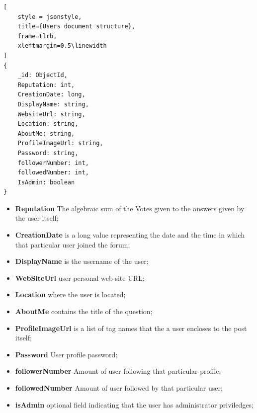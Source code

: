 \documentclass[11pt]{report}
\begin{document}
\begin{lstlisting}[
    style = jsonstyle,
    title={Users document structure},
    frame=tlrb,
    xleftmargin=0.5\linewidth
]
{
    _id: ObjectId,
    Reputation: int,
    CreationDate: long,
    DisplayName: string,
    WebsiteUrl: string,
    Location: string,
    AboutMe: string,
    ProfileImageUrl: string,
    Password: string,
    followerNumber: int,
    followedNumber: int,
    IsAdmin: boolean
}
\end{lstlisting}

\begin{itemize}
  \item \textbf{Reputation} The algebraic sum of the Votes given to the answers given by the user itself;
  \item \textbf{CreationDate} is a long value representing the date and the time in which that particular user joined the forum;
  \item \textbf{DisplayName} is the username of the user;
  \item \textbf{WebSiteUrl} user personal web-site URL;
  \item \textbf{Location} where the user is located;
  \item \textbf{AboutMe} contains the title of the question;
  \item \textbf{ProfileImageUrl} is a list of tag names that the a user encloses to the post itself;
  \item \textbf{Password} User profile password;
  \item \textbf{followerNumber} Amount of user following that particular profile;
  \item \textbf{followedNumber} Amount of user followed by that particular user;
  \item \textbf{isAdmin} optional field indicating that the user has administrator priviledges;
\end{itemize}

\newpage
\end{document}
